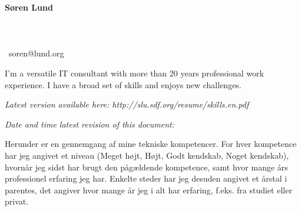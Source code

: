 \documentclass[a4paper,11pt]{article}
\newcommand\redacted{[skjult i online version]}
\newcommand\myaddressone{\redacted}
\newcommand\myaddresstwo{\redacted}
\newcommand\myphone{\redacted}
\begin{document}
\centerline{}
\centerline{}

\begin{minipage}[b]{0.30\textwidth}
  \selectfont%
  \textbf{Søren Lund} \\
  \myaddressone \\
  \myaddresstwo \\
  \myphone \\
  \Email\ soren@lund.org
\end{minipage}%
\hfill
\begin{minipage}[b]{0.30\textwidth}
  \selectfont%
  I'm a versatile IT consultant with
  more than 20 years professional 
  work experience. I have a broad
  set of skills and enjoys new
challenges.
\end{minipage}

\bigskip
\centerline{\small\textit{Latest version available here: http://slu.sdf.org/resume/skills.en.pdf}}
\centerline{\small\textit{Date and time latest revision of this document: }}

\bigskip
\bigskip

\newcommand\High{Meget højt}
\newcommand\high{Højt}
\newcommand\know{Godt kendskab}
\newcommand\some{Noget kendskab}

Herunder er en gennemgang af mine tekniske kompetencer. For hver
kompetence har jeg angivet et niveau (\High, \high, \know, \some),
hvornår jeg sidst har brugt den pågældende kompetence, samt hvor
mange års professionel erfaring jeg har. Enkelte steder har jeg
desuden angivet et årstal i parentes, det angiver hvor mange år jeg i
alt har erfaring, f.eks. fra studiet eller privat.
\end{document}
